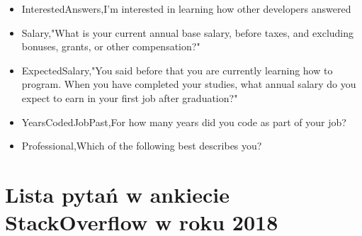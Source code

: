 \begin{appendices}
\begin{itemize}
        \item InterestedAnswers,I'm interested in learning how other developers answered
        \item Salary,"What is your current annual base salary, before taxes, and excluding bonuses, grants, or other compensation?"
        \item ExpectedSalary,"You said before that you are currently learning how to program. When you have completed your studies, what annual salary do you expect to earn in your first job after graduation?"
        \item YearsCodedJobPast,For how many years did you code as part of your job?
        \item Professional,Which of the following best describes you?
    \end{itemize}


    \chapter{Lista pytań w ankiecie StackOverflow w roku 2018}\label{app:dod2}


\end{appendices}

